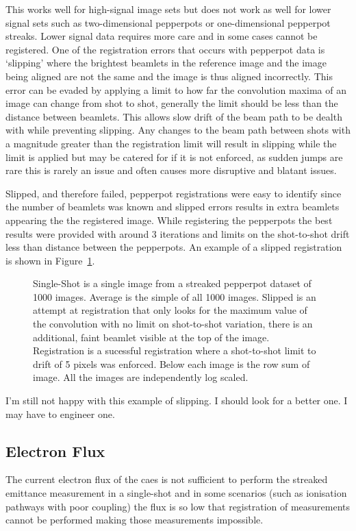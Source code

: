 This works well for high-signal image sets but does not work as well for lower signal sets such as two-dimensional pepperpots or one-dimensional pepperpot streaks.
Lower signal data requires more care and in some cases cannot be registered.
One of the registration errors that occurs with pepperpot data is `slipping' where the brightest beamlets in the reference image and the image being aligned are not the same and the image is thus aligned incorrectly.
This error can be evaded by applying a limit to how far the convolution maxima of an image can change from shot to shot, generally the limit should be less than the distance between beamlets.
This allows slow drift of the beam path to be dealth with while preventing slipping.
Any changes to the beam path between shots with a magnitude greater than the registration limit will result in slipping while the limit is applied but may be catered for if it is not enforced, as sudden jumps are rare this is rarely an issue and often causes more disruptive and blatant issues.

Slipped, and therefore failed, pepperpot registrations were easy to identify since the number of beamlets was known and slipped errors results in extra beamlets appearing the the registered image.
While registering the pepperpots the best results were provided with around 3 iterations and limits on the shot-to-shot drift less than distance between the pepperpots.
An example of a slipped registration is shown in Figure~\ref{figure:registration_examples}.

\begin{figure}
    \center
    
    \caption{Single-Shot is a single image from a streaked pepperpot dataset of 1000 images. Average is the simple of all 1000 images. Slipped is an attempt at registration that only looks for the maximum value of the convolution with no limit on shot-to-shot variation, there is an additional, faint beamlet visible at the top of the image. Registration is a sucessful registration where a shot-to-shot limit to drift of 5 pixels was enforced. Below each image is the row sum of image. All the images are independently log scaled.}
    \label{figure:registration_examples}
\end{figure}

{\color{red} I'm still not happy with this example of slipping. I should look for a better one. I may have to engineer one.}

\subsection{Electron Flux}
The current electron flux of the \gls{caes} is not sufficient to perform the streaked emittance measurement in a single-shot and in some scenarios (such as ionisation pathways with poor coupling) the flux is so low that registration of measurements cannot be performed making those measurements impossible.

